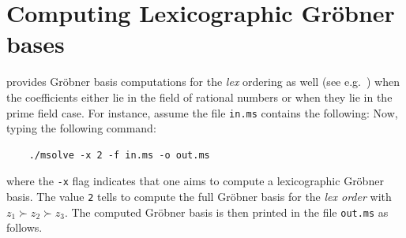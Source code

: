 \documentclass[a4paper,english,11pt]{scrartcl}
\theoremstyle{definition}
\theoremstyle{remark}
\begin{document}
\section{Computing Lexicographic Gröbner bases}\label{sec:lexgb}
\msolve provides Gr\"obner basis computations for the \emph{lex} ordering
as well (see e.g.~\cite{CLO}) when the coefficients either lie in the field of
rational numbers or when they lie in the prime field case. For instance, assume
the file \verb+in.ms+ contains the following:
 Now, typing the following
command:
\begin{tcolorbox} %
  \begin{verbatim}
    ./msolve -x 2 -f in.ms -o out.ms
  \end{verbatim}
\end{tcolorbox}
where the \verb+-x+ flag indicates that one aims to compute a lexicographic Gr\"obner
basis. The value \verb+2+ tells \msolve to compute the full Gr\"obner basis for the
\emph{lex order} with $z_1\succ z_2 \succ z_3 $. The computed Gr\"obner basis
is then printed in the file \verb+out.ms+ as follows.
\end{document}
